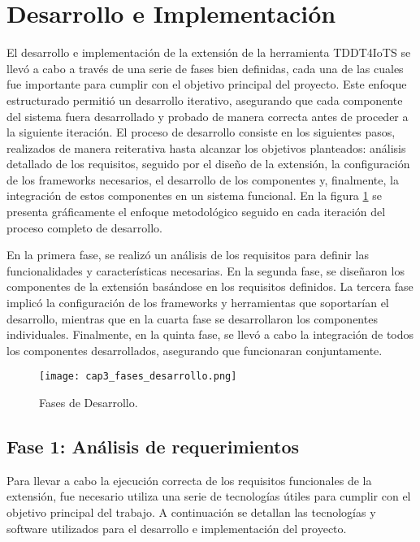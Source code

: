 \section{Desarrollo e Implementación}

El desarrollo e implementación de la extensión de la herramienta TDDT4IoTS se llevó a cabo a través de una serie de fases bien definidas, cada una de las cuales fue importante para cumplir con el objetivo principal del proyecto. Este enfoque estructurado permitió un desarrollo iterativo, asegurando que cada componente del sistema fuera desarrollado y probado de manera correcta antes de proceder a la siguiente iteración. El proceso de desarrollo consiste en los siguientes pasos, realizados de manera reiterativa hasta alcanzar los objetivos planteados: análisis detallado de los requisitos, seguido por el diseño de la extensión, la configuración de los frameworks necesarios, el desarrollo de los componentes y, finalmente, la integración de estos componentes en un sistema funcional. En la figura \ref{fig:cap3_fases_desarrollo} se presenta gráficamente el enfoque metodológico seguido en cada iteración del proceso completo de desarrollo.

En la primera fase, se realizó un análisis de los requisitos para definir las funcionalidades y características necesarias. En la segunda fase, se diseñaron los componentes de la extensión basándose en los requisitos definidos. La tercera fase implicó la configuración de los frameworks y herramientas que soportarían el desarrollo, mientras que en la cuarta fase se desarrollaron los componentes individuales. Finalmente, en la quinta fase, se llevó a cabo la integración de todos los componentes desarrollados, asegurando que funcionaran conjuntamente.

\begin{figure}[H]  
	\centering
	\texttt{[image: cap3\_fases\_desarrollo.png]}
	\caption{Fases de Desarrollo.}
	\label{fig:cap3_fases_desarrollo}
\end{figure}


\subsection{Fase 1: Análisis de requerimientos}

Para llevar a cabo la ejecución correcta de los requisitos funcionales de la extensión, fue necesario utiliza una serie de tecnologías útiles para cumplir con el objetivo principal del trabajo. A continuación se detallan las tecnologías y software utilizados para el desarrollo e implementación del proyecto.

